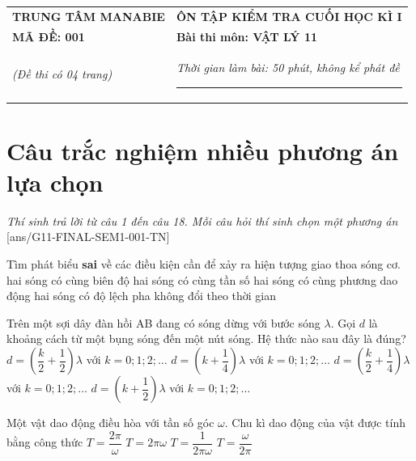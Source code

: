 \begin{center}
	\begin{tabular}{M{9.25cm}M{8.75cm}}
		\textbf{TRUNG TÂM MANABIE}& \textbf{ÔN TẬP KIỂM TRA CUỐI HỌC KÌ I}\\
		\textbf{MÃ ĐỀ: 001}& \textbf{Bài thi môn: VẬT LÝ 11}\\
		\textit{(Đề thi có 04 trang)}& \textit{Thời gian làm bài: 50 phút, không kể phát đề}
		
		\noindent\rule{4cm}{0.8pt} \\
	\end{tabular}
\end{center}
\setcounter{section}{0}
\section{Câu trắc nghiệm nhiều phương án lựa chọn}
\textit{Thí sinh trả lời từ câu 1 đến câu 18. Mỗi câu hỏi thí sinh chọn một phương án}
\setcounter{ex}{0}
[ans/G11-FINAL-SEM1-001-TN]
\begin{ex}
	Tìm phát biểu \textbf{sai} về các điều kiện cần để xảy ra hiện tượng giao thoa sóng cơ. 
	\choice
	{\True hai sóng có cùng biên độ}
	{hai sóng có cùng tần số}
	{hai sóng có cùng phương dao động}
	{hai sóng có độ lệch pha không đổi theo thời gian}
	\loigiai{}
\end{ex}
\begin{ex}
	Trên một sợi dây đàn hồi AB đang có sóng dừng với bước sóng $\lambda$. Gọi $d$ là khoảng cách từ một bụng sóng đến một nút sóng. Hệ thức nào sau đây là đúng? 
	\choice
	{$d=\left(\dfrac{k}{2}+\dfrac{1}{2}\right)\lambda$ với $k=0; 1; 2; \dots$}
	{$d=\left(k+\dfrac{1}{4}\right)\lambda$ với $k=0; 1; 2; \dots$}
	{\True $d=\left(\dfrac{k}{2}+\dfrac{1}{4}\right)\lambda$ với $k=0; 1; 2; \dots$}
	{$d=\left(k+\dfrac{1}{2}\right)\lambda$ với $k=0; 1; 2; \dots$}
\end{ex}
\begin{ex}
Một vật dao động điều hòa với tần số góc $\omega$. Chu kì dao động của vật được tính bằng công thức
	\choice
	{\True $T=\dfrac{2\pi}{\omega}$}
	{$T=2\pi \omega$}
	{$T=\dfrac{1}{2\pi \omega}$}
	{$T=\dfrac{\omega}{2\pi}$}
	\loigiai{}
\end{ex}
